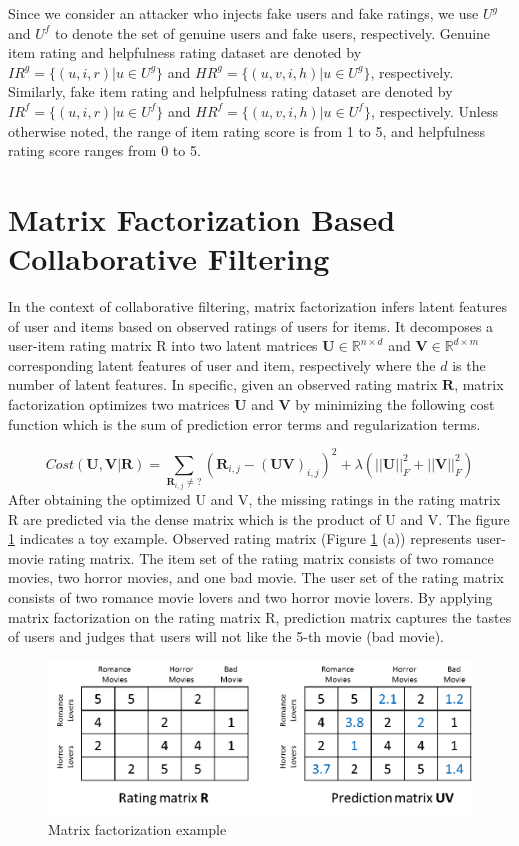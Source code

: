 \documentclass[master,english,final]{kaist-ucs}
\begin{document}
Since we consider an attacker who injects fake users and fake ratings, we use $U^g$ and $U^f$ to denote the set of genuine users and fake users, respectively.
Genuine item rating and helpfulness rating dataset are denoted by $IR^g=\{(u,i,r)|u \in U^g\}$ and $HR^g=\{(u,v,i,h)|u \in U^g\}$, respectively.
Similarly, fake item rating and helpfulness rating dataset are denoted by $IR^f=\{(u,i,r)|u \in U^f\}$ and $HR^f=\{(u,v,i,h)|u \in U^f\}$, respectively.
Unless otherwise noted, the range of item rating score is from 1 to 5, and helpfulness rating score ranges from 0 to 5.




\section{Matrix Factorization Based Collaborative Filtering}
In the context of collaborative filtering, matrix factorization infers latent features of user and items based on observed ratings of users for items.
It decomposes a user-item rating matrix R into two latent matrices $\bm{U} \in \mathbb{R}^{n \times d}$ and $\bm{V} \in \mathbb{R}^{d \times m}$ corresponding latent features of user and item, respectively where the $d$ is the number of latent features.
In specific, given an observed rating matrix $\bm{R}$, matrix factorization optimizes two matrices $\bm{U}$ and $\bm{V}$ by minimizing the following cost function which is the sum of prediction error terms and regularization terms.

\begin{equation}
Cost(\bm{U},\bm{V} | \bm{R})=\sum_{\bm{R}_{i,j} \neq ?} (  \bm{R}_{i,j} - (\bm{UV})_{i,j} )^2 + \lambda(||\bm{U}||_F^2+||\bm{V}||_F^2)
\end{equation}
After obtaining the optimized U and V, the missing ratings in the rating matrix R are predicted via the dense matrix which is the product of U and V.
The figure \ref{mf_base} indicates a toy example.
Observed rating matrix (Figure \ref{mf_base} (a)) represents user-movie rating matrix.
The item set of the rating matrix consists of two romance movies, two horror movies, and one bad movie.
The user set of the rating matrix consists of two romance movie lovers and two horror movie lovers.
By applying matrix factorization on the rating matrix R, prediction matrix captures the tastes of users and judges that users will not like the 5-th movie (bad movie).


\begin{figure}[h]
    \centerline{\includegraphics[width=12.5cm]{figure/mf_base}}
    \caption{ Matrix factorization example    } \label{mf_base}
\end{figure}
\end{document}
